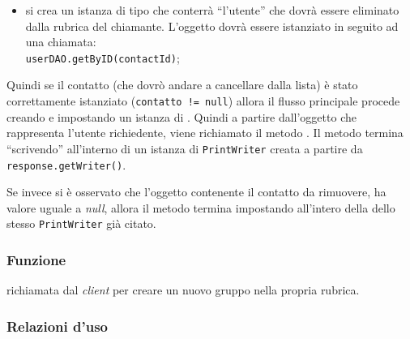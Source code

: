 \begin{description}
\begin{itemize}
		\item si crea un istanza di tipo  che conterrà ``l'utente'' che dovrà essere eliminato dalla rubrica del chiamante. L'oggetto dovrà essere istanziato in seguito ad una chiamata:\\
		\verb|userDAO.getByID(contactId)|;
	\end{itemize}
	Quindi se il contatto (che dovrò andare a cancellare dalla lista) è stato correttamente istanziato (\texttt{contatto != null}) allora il flusso principale procede creando e impostando un istanza di . Quindi a partire dall'oggetto che rappresenta l'utente richiedente, viene richiamato il metodo . Il metodo termina ``scrivendo''  all'interno di un istanza di \texttt{PrintWriter} creata a partire da \texttt{response.getWriter()}.
	
	Se invece si è osservato che l'oggetto contenente il contatto da rimuovere, ha valore uguale a \textit{null}, allora il metodo termina impostando  all'intero della dello stesso \texttt{PrintWriter} già citato.
\end{description}



\subsubsection*{Funzione}
 richiamata dal \textit{client} per creare un nuovo gruppo nella propria rubrica.

\subsubsection*{Relazioni d'uso}


